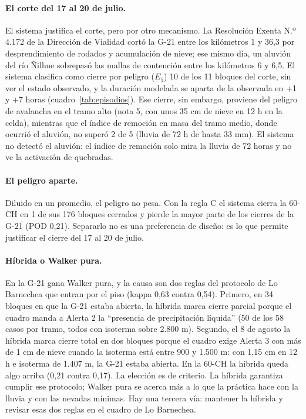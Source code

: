 \paragraph{El corte del 17 al 20 de julio.} El sistema justifica el corte, pero por otro mecanismo. La Resolución Exenta N.º 4.172 de la Dirección de Vialidad cortó la G-21 entre los kilómetros 1 y 36,3 por desprendimiento de rodados y acumulación de nieve; ese mismo día, un aluvión del río Ñilhue sobrepasó las mallas de contención entre los kilómetros 6 y 6,5. El sistema clasifica como cierre por peligro ($E_5$) 10 de los 11 bloques del corte, sin ver el estado observado, y la duración modelada se aparta de la observada en +1 y +7 horas (cuadro~\ref{tab:episodios}). Ese cierre, sin embargo, proviene del peligro de avalancha en el tramo alto (nota 5, con unos 35 cm de nieve en 12 h en la celda), mientras que el índice de remoción en masa del tramo medio, donde ocurrió el aluvión, no superó 2 de 5 (lluvia de 72 h de hasta 33 mm). El sistema no detectó el aluvión: el índice de remoción solo mira la lluvia de 72 horas y no ve la activación de quebradas.

\paragraph{El peligro aparte.} Diluido en un promedio, el peligro no pesa. Con la regla C el sistema cierra la 60-CH en 1 de sus 176 bloques cerrados y pierde la mayor parte de los cierres de la G-21 (POD 0,21). Separarlo no es una preferencia de diseño: es lo que permite justificar el cierre del 17 al 20 de julio.

\paragraph{Híbrida o Walker pura.} En la G-21 gana Walker pura, y la causa son dos reglas del protocolo de Lo Barnechea que entran por el piso (kappa 0,63 contra 0,54). Primero, en 34 bloques en que la G-21 estaba abierta, la híbrida marca cierre parcial porque el cuadro manda a Alerta 2 la ``presencia de precipitación líquida'' (50 de los 58 casos por tramo, todos con isoterma sobre 2.800 m). Segundo, el 8 de agosto la híbrida marca cierre total en dos bloques porque el cuadro exige Alerta 3 con más de 1 cm de nieve cuando la isoterma está entre 900 y 1.500 m: con 1,15 cm en 12 h e isoterma de 1.407 m, la G-21 estaba abierta. En la 60-CH la híbrida queda algo arriba (0,21 contra 0,17). La elección es de criterio. La híbrida garantiza cumplir ese protocolo; Walker pura se acerca más a lo que la práctica hace con la lluvia y con las nevadas mínimas. Hay una tercera vía: mantener la híbrida y revisar esas dos reglas en el cuadro de Lo Barnechea.

